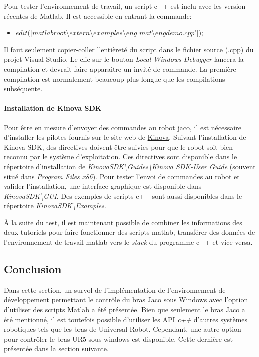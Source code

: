 \documentclass[root.tex]{subfiles}
\begin{document}
Pour tester l'environnement de travail, un script c++ est inclu avec les version récentes de Matlab. 
Il est accessible en entrant la commande:
\begin{itemize}
\item $ edit([ matlabroot $\textbackslash$ extern$\textbackslash$ examples$\textbackslash$ eng\_mat$\textbackslash$ engdemo.cpp' ]);$
\end{itemize}

Il faut seulement copier-coller l'entièreté du script dans le fichier source (.cpp) du projet Visual Studio. Le clic sur le bouton \textit{Local Windows Debugger} lancera la compilation et devrait faire apparaitre un invité de commande. 
La première compilation est normalement beaucoup plus longue que les compilations subséquente.

\paragraph{Installation de Kinova SDK}
Pour être en mesure d'envoyer des commandes au robot jaco, il est nécessaire d'installer les pilotes fournis sur le site web de \href{https://drive.google.com/open?id=0B790iVm0vRTlRFNFRldIb2Jmbkk}{Kinova}.
Suivant l'installation de Kinova SDK, des directives doivent être suivies pour que le robot soit bien reconnu par le système d'exploitation.
Ces directives sont disponible dans le répertoire d'installation de \textit{KinovaSDK\textbackslash Guides\textbackslash Kinova SDK-User Guide} (souvent situé dans \textit{Program Files x86}).
Pour tester l'envoi de commandes au robot et valider l'installation, une interface graphique est disponible dans \textit{KinovaSDK\textbackslash GUI}.
Des exemples de scripts c++ sont aussi disponibles dans le répertoire \textit{KinovaSDK\textbackslash Examples}.


À la suite du test, il est maintenant possible de combiner les informations des deux tutoriels pour faire fonctionner des scripts matlab, transférer des données de l'environnement de travail matlab vers le \textit{stack} du programme c++ et vice versa.

\subsection{Conclusion}

Dans cette section, un survol de l'implémentation de l'environnement de développement permettant le contrôle du bras Jaco sous Windows avec l'option d'utiliser des scripts Matlab a été présentée.
Bien que seulement le bras Jaco a été mentionné, il est toutefois possible d'utiliser les API \textit{c++} d'autres systèmes robotiques tels que les bras de Universal Robot. 
Cependant, une autre option pour contrôler le bras UR5 sous windows est disponible.
Cette dernière est présentée dans la section suivante.
\end{document}
